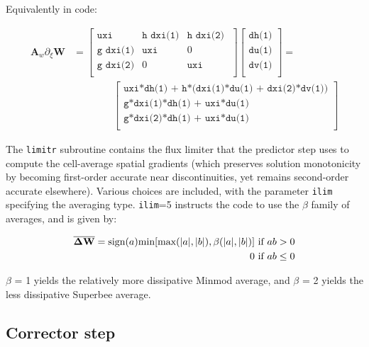 \documentclass{article}
\newcommand{\code}[1]{\texttt{#1}}
\begin{document}
Equivalently in code:

\begin{equation*}\label{theta-alt}
\begin{aligned}
\mathbf{A}_w \partial_\xi \mathbf{W}  &=
 \begin{bmatrix}
     \code{uxi} & \code{h dxi(1)} & \code{h  dxi(2) } \\
     \code{g dxi(1)} & \code{uxi} &  0  \\     
     \code{g dxi(2)} & 0 &  \code{uxi}  \\     
\end{bmatrix}
	 \begin{bmatrix}
	 \code{dh(1)} \\
	 \code{du(1)} \\	 
	 \code{dv(1)} \\	 	  	 	 
\end{bmatrix}  = \\
&\qquad\qquad
	 \begin{bmatrix}
	  \code{uxi*dh(1) + h*(dxi(1)*du(1) + dxi(2)*dv(1))} \\
	   \code{g*dxi(1)*dh(1)  + uxi*du(1) } \\ 	 	 	 	 
	   \code{g*dxi(2)*dh(1)  + uxi*du(1) } \\ 	 	 	 	 	   
\end{bmatrix} 
\end{aligned}
\end{equation*}



The \code{limitr} subroutine contains the flux limiter that the predictor step uses to compute the cell-average spatial gradients (which preserves solution monotonicity by becoming first-order accurate near discontinuities, yet remains second-order accurate elsewhere).
Various choices are included, with the parameter \code{ilim} specifying the averaging type. \code{ilim}=5 instructs the code to use the $\beta$ family of averages, and is given by:

\begin{eqnarray*}
	\mathbf{\overline{\Delta W}} = \text{sign}(a)\text{min}[\text{max}(|a|, |b|), \beta(|a|, |b|)]  \textmd{ if }  ab>0  \\ 
	0 \textmd{ if }  ab \leq 0	
\end{eqnarray*}

$\beta$ = 1 yields the relatively more dissipative Minmod average, and $\beta $ = 2 yields the less dissipative Superbee average. 


\subsection{Corrector step}
\end{document}
